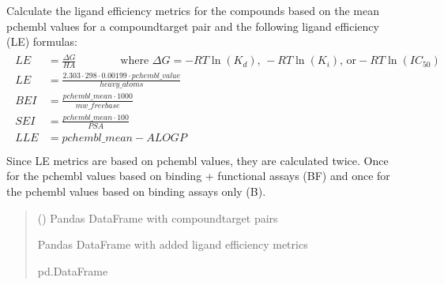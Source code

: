 \documentclass[letterpaper,10pt,english]{sphinxmanual}
\begin{document}

\begin{fulllineitems}
\label{\detokenize{add_chembl_compound_properties:add_chembl_compound_properties.add_ligand_efficiency_metrics}}
\pysigstartsignatures
{}
\pysigstopsignatures
\sphinxAtStartPar
Calculate the ligand efficiency metrics for the compounds
based on the mean pchembl values for a compound\sphinxhyphen{}target pair and
the following ligand efficiency (LE) formulas:
\begin{align*}\!\begin{aligned}
LE &= \frac{\Delta G}{HA}
    \qquad \qquad \text{where } \Delta G = - RT \ln(K_d)
    \text{, } - RT\ln(K_i)
    \text{,  or} - RT\ln(IC_{50})\\
LE &= \frac{2.303 \cdot 298 \cdot 0.00199 \cdot pchembl \_ value} {heavy \_ atoms}\\
BEI &= \frac{pchembl \_ mean \cdot 1000}{mw \_ freebase}\\
SEI &= \frac{pchembl \_ mean \cdot 100}{PSA}\\
LLE &= pchembl \_ mean - ALOGP\\
\end{aligned}\end{align*}
\sphinxAtStartPar
Since LE metrics are based on pchembl values, they are calculated twice.
Once for the pchembl values based on binding + functional assays (BF)
and once for the pchembl values based on binding assays only (B).
\begin{quote}\begin{description}
\sphinxAtStartPar
{} () \textendash{} Pandas DataFrame with compound\sphinxhyphen{}target pairs

\sphinxAtStartPar
Pandas DataFrame with added ligand efficiency metrics

\sphinxAtStartPar
pd.DataFrame

\end{description}\end{quote}

\end{fulllineitems}
\end{document}
